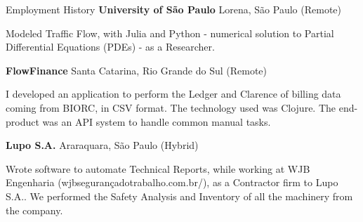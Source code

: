 \begin{rubric}{Employment History}
\textbf{University of São Paulo} Lorena, São Paulo (Remote)
\par Modeled Traffic Flow, with Julia and Python - numerical solution to Partial Differential Equations (PDEs) - as a Researcher.

\textbf{FlowFinance} Santa Catarina, Rio Grande do Sul (Remote)
\par I developed an application to perform the Ledger and Clarence of billing data coming from BIORC, in CSV format. The technology used was Clojure. The end-product was an API system to handle common manual tasks.

\textbf{Lupo S.A.} Araraquara, São Paulo (Hybrid)
\par Wrote software to automate Technical Reports, while working at WJB Engenharia (wjbsegurançadotrabalho.com.br/), as a Contractor firm to Lupo S.A.. We performed the Safety Analysis and Inventory of all the machinery from the company.


\end{rubric}
